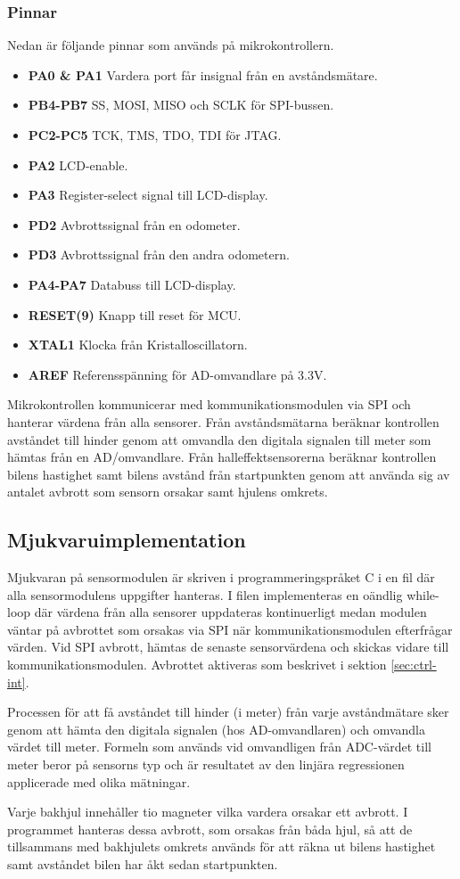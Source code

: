 \documentclass[tekniskrapport/tech.tex]{subfiles}
\begin{document}
\subsubsection{Pinnar}
Nedan är följande pinnar som används på mikrokontrollern.
\begin{itemize}
   \item \textbf{PA0 \& PA1} Vardera port får insignal från en avståndsmätare.
   \item \textbf{PB4-PB7} SS, MOSI, MISO och SCLK för SPI-bussen.
   \item \textbf{PC2-PC5} TCK, TMS, TDO, TDI för JTAG.
   \item \textbf{PA2} LCD-enable.
   \item \textbf{PA3} Register-select signal till LCD-display.
   \item \textbf{PD2} Avbrottssignal från en odometer.
   \item \textbf{PD3} Avbrottssignal från den andra odometern.
   \item \textbf{PA4-PA7} Databuss till LCD-display.
   \item \textbf{RESET(9)} Knapp till reset för MCU.
   \item \textbf{XTAL1} Klocka från Kristalloscillatorn. 
   \item \textbf{AREF} Referensspänning för AD-omvandlare på 3.3V.

\end{itemize}
Mikrokontrollen kommunicerar med kommunikationsmodulen via SPI och hanterar
värdena från alla sensorer. Från avståndsmätarna beräknar kontrollen avståndet
till hinder genom att omvandla den digitala signalen till meter som hämtas från
en AD/omvandlare. Från halleffektsensorerna beräknar kontrollen bilens
hastighet samt bilens avstånd från startpunkten genom att använda sig av
antalet avbrott som sensorn orsakar samt hjulens omkrets.

\subsection{Mjukvaruimplementation} 
Mjukvaran på sensormodulen är skriven i programmeringspråket C i en fil där
alla sensormodulens uppgifter hanteras. I filen implementeras en oändlig
while-loop där värdena från alla sensorer uppdateras kontinuerligt medan
modulen väntar på avbrottet som orsakas via SPI när kommunikationsmodulen
efterfrågar värden. Vid SPI avbrott, hämtas de senaste sensorvärdena och
skickas vidare till kommunikationsmodulen. Avbrottet aktiveras som beskrivet i
sektion \ref{sec:ctrl-int}.

Processen för att få avståndet till hinder (i meter) från varje avståndmätare
sker genom att hämta den digitala signalen (hos AD-omvandlaren) och omvandla
värdet till meter. Formeln som används vid omvandligen från ADC-värdet till
meter beror på sensorns typ och är resultatet av den linjära regressionen
applicerade med olika mätningar.

Varje bakhjul innehåller tio magneter vilka vardera orsakar ett avbrott. I
programmet hanteras dessa avbrott, som orsakas från båda hjul, så att de
tillsammans med bakhjulets omkrets används för att räkna ut bilens hastighet
samt avståndet bilen har åkt sedan startpunkten.
\end{document}
